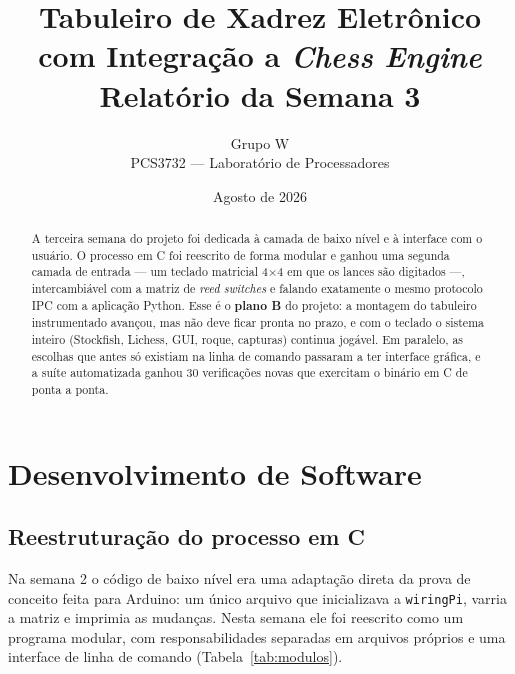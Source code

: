 \documentclass[12pt,a4paper]{article}
\title{Tabuleiro de Xadrez Eletrônico com Integração a \emph{Chess Engine}\\[6pt]
       \large Relatório da Semana 3}
\author{Grupo W\\ PCS3732 --- Laboratório de Processadores}
\date{Agosto de 2026}
\begin{document}
\maketitle

\begin{abstract}
\noindent
A terceira semana do projeto foi dedicada à camada de baixo nível e à interface
com o usuário. O processo em C foi reescrito de forma modular e ganhou uma
segunda camada de entrada --- um teclado matricial 4$\times$4 em que os lances
são digitados ---, intercambiável com a matriz de \emph{reed switches} e
falando exatamente o mesmo protocolo IPC com a aplicação Python. Esse é o
\textbf{plano B} do projeto: a montagem do tabuleiro instrumentado avançou, mas
não deve ficar pronta no prazo, e com o teclado o sistema inteiro (Stockfish,
Lichess, GUI, roque, capturas) continua jogável. Em paralelo, as escolhas que
antes só existiam na linha de comando passaram a ter interface gráfica, e a
suíte automatizada ganhou 30 verificações novas que exercitam o binário em C de
ponta a ponta.
\end{abstract}

\tableofcontents
\newpage

\section{Desenvolvimento de Software}

\subsection{Reestruturação do processo em C}

Na semana 2 o código de baixo nível era uma adaptação direta da prova de
conceito feita para Arduino: um único arquivo que inicializava a
\texttt{wiringPi}, varria a matriz e imprimia as mudanças. Nesta semana ele foi
reescrito como um programa modular, com responsabilidades separadas em
arquivos próprios e uma interface de linha de comando (Tabela~\ref{tab:modulos}).
\end{document}

